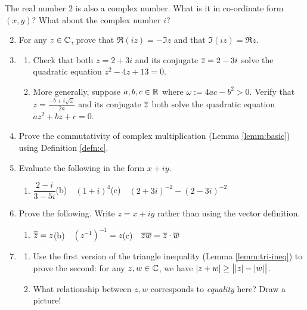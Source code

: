\begin{exercises}
	\exstart The real number 2 is also a complex number. What is it in co-ordinate form $(x,y)$? What about the complex number $i$?
	\begin{enumerate}\setcounter{enumi}{1}
	  \item For any $z\in\mathbb{C}$, prove that $\Re(iz)=-\Im z$ and that $\Im(iz)=\Re z$.
	  
	  \item\begin{enumerate}
	    \item Check that both $z=2+3i$ and its conjugate $\overline{z}=2-3i$ solve the quadratic equation $z^2-4z+13=0$.
	    \item More generally, suppose $a,b,c\in\mathbb{R}$ where $\omega:=4ac-b^2>0$. Verify that $z=\frac{-b+i\sqrt \omega}{2a}$ and its conjugate $\overline{z}$ both solve\footnotemark{} the quadratic equation $az^2+bz+c=0$.\par
	    
	  \end{enumerate}
	
	  \item Prove the commutativity of complex multiplication (Lemma \ref{lemm:basic}) using Definition \ref{defn:c}.
	  
	  \item Evaluate the following in the form $x+iy$.
	  \begin{enumerate}
	    \item $\dfrac{2-i}{3-5i}$\qquad (b)\ \ $(1+i)^4$\qquad (c)\ \ $(2+3i)^{-2}-(2-3i)^{-2}$
	  \end{enumerate}
	  
	  \item Prove the following. Write $z=x+iy$ rather than using the vector definition.
	  \begin{enumerate}
	    \item $\overline{\overline{z}}=z$\qquad (b)\ \ $(z^{-1})^{-1}=z$\qquad (c)\ \ $\overline{zw}=\overline{z}\cdot \overline{w}$
	  \end{enumerate}
	  
	  \item\label{ex:triangmod}\begin{enumerate}
	    \item Use the first version of the triangle inequality (Lemma \ref{lemm:tri-ineq}) to prove the second: for any $z,w\in\mathbb{C}$, we have $\displaystyle \left| z+w\right|\ge \bigl|\left| z\right|-\left| w\right|\bigr|$.
	    \item What relationship between $z,w$ corresponds to \emph{equality} here? Draw a picture!
	  \end{enumerate}
	  

\end{enumerate}
\end{exercises}
